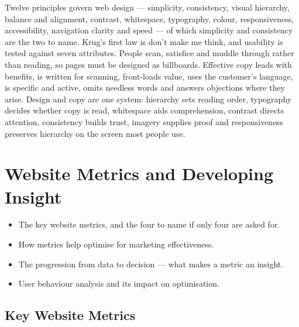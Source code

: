 \documentclass{MMTextbook}
\begin{document}
\begin{summarybox}
Twelve principles govern web design --- simplicity, consistency, visual
hierarchy, balance and alignment, contrast, whitespace, typography, colour,
responsiveness, accessibility, navigation clarity and speed --- of which
simplicity and consistency are the two to name. Krug's first law is don't make me
think, and usability is tested against seven attributes. People scan, satisfice
and muddle through rather than reading, so pages must be designed as billboards.
Effective copy leads with benefits, is written for scanning, front-loads value,
uses the customer's language, is specific and active, omits needless words and
answers objections where they arise. Design and copy are one system: hierarchy
sets reading order, typography decides whether copy is read, whitespace aids
comprehension, contrast directs attention, consistency builds trust, imagery
supplies proof and responsiveness preserves hierarchy on the screen most people
use.
\end{summarybox}

\chapter{Website Metrics and Developing Insight}


\begin{learningoutcomes}
\begin{itemize}
\item The key website metrics, and the four to name if only four are asked for.
\item How metrics help optimise for marketing effectiveness.
\item The progression from data to decision --- what makes a metric an insight.
\item User behaviour analysis and its impact on optimisation.
\end{itemize}
\end{learningoutcomes}

\section{Key Website Metrics}
\end{document}
